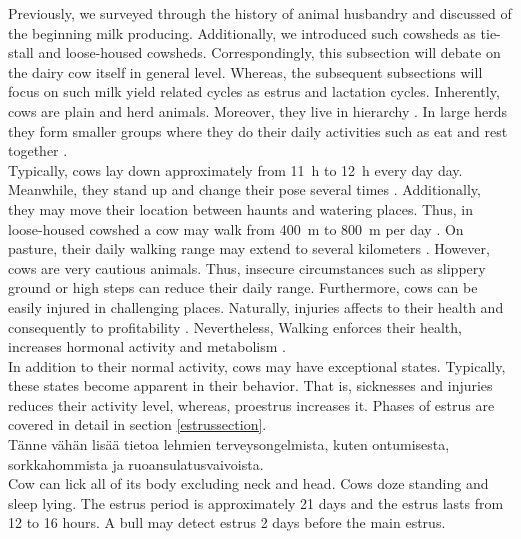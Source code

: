 \documentclass[english,12pt,a4paper,pdftex,elec,utf8]{aaltothesis}
\begin{document}
Previously, we surveyed through the history of animal husbandry and discussed of the beginning milk producing. Additionally, we introduced such cowsheds as tie-stall and loose-housed cowsheds. Correspondingly, this subsection will debate on the dairy cow itself in general level. Whereas, the subsequent subsections will focus on such milk yield related cycles as estrus and lactation cycles. Inherently, cows are plain and herd animals. Moreover, they live in hierarchy \cite{julkaisuja52}. In large herds they form smaller groups where they do their daily activities such as eat and rest together \cite{julkaisuja52, lehmahavaintoja}. \\

Typically, cows lay down approximately from \SI{11}{\hour} to \SI{12}{\hour} every day day. Meanwhile, they stand up and change their pose several times \cite{luomunaudanruokinta}. Additionally, they may move their location between haunts and watering places. Thus, in loose-housed cowshed a cow may walk from  \SI{400}{\metre} to \SI{800}{\metre} per day \cite{luomuopas}. On pasture, their daily walking range may extend to several kilometers \cite{luomuopas, julkaisuja52}. However,  cows are very cautious animals. Thus, insecure circumstances such as slippery ground or high steps can reduce their daily range. Furthermore, cows can be easily injured in challenging places. Naturally, injuries affects to their health and consequently to profitability \cite{lehmahavaintoja}. Nevertheless, Walking enforces their health, increases hormonal activity and metabolism \cite{luomuopas}. \\

In addition to their normal activity, cows may have exceptional states. Typically, these states become apparent in their behavior. That is, sicknesses and injuries reduces their activity level, whereas, proestrus increases it. Phases of estrus are covered in detail in section \ref{estrussection}. \\

Tänne vähän lisää tietoa lehmien terveysongelmista, kuten ontumisesta, sorkkahommista ja ruoansulatusvaivoista. \\

 

 Cow can lick all of its body excluding neck and head. Cows doze standing and sleep lying. The estrus period is approximately 21 days and the estrus lasts from 12 to 16 hours. A bull may detect estrus 2 days before the main estrus.   \cite{julkaisuja52}
\end{document}

